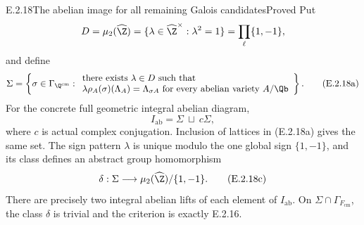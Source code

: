 \begin{result}{E.2.18}{The abelian image for all remaining Galois candidates}{Proved}
Put
\[
 D=\mu_2(\widehat\Z)
   =\{\lambda\in\widehat\Z^\times:\lambda^2=1\}
   =\prod_\ell\{1,-1\},
\]
and define
\[
 \Sigma=\left\{\sigma\in\Gamma_{\Q^{\mathrm{cm}}}:
 \begin{array}{l}
  \text{there exists }\lambda\in D\text{ such that}\\
  \lambda\rho_A(\sigma)(\Lambda_A)=\Lambda_{\sigma A}
       \text{ for every abelian variety }A/\Qb
 \end{array}\right\}.
 \tag{E.2.18a}
\]
For the concrete full geometric integral abelian diagram,
\[
 I_{\mathrm{ab}}=\Sigma\ \sqcup\ c\Sigma,
 \tag{E.2.18b}
\]
where \(c\) is actual complex conjugation. Inclusion of lattices
in (E.2.18a) gives the same set. The sign pattern \(\lambda\)
is unique modulo the one global sign \(\{1,-1\}\), and its class
defines an abstract group homomorphism
\[
 \delta:\Sigma\longrightarrow
       \mu_2(\widehat\Z)/\{1,-1\}.
 \tag{E.2.18c}
\]
There are precisely two integral abelian lifts of each element
of \(I_{\mathrm{ab}}\). On
\(\Sigma\cap\Gamma_{F_{\mathrm{cm}}}\), the class \(\delta\)
is trivial and the criterion is exactly E.2.16.
\end{result}
